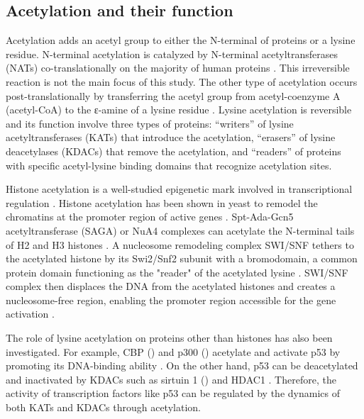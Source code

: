 \subsection{Acetylation and their function}
Acetylation adds an acetyl group to either the N-terminal of proteins or a lysine residue. N-terminal acetylation is catalyzed by N-terminal acetyltransferases (NATs) co-translationally on the majority of human proteins \cite{starheimkk_arnesent:ProteinNterminal2012}. This irreversible reaction is not the main focus of this study. The other type of acetylation occurs post-translationally by transferring the acetyl group from acetyl-coenzyme A (acetyl-CoA) to the ε-amine of a lysine residue \cite{alii_ottm:LysineAcetylation2018}. Lysine acetylation is reversible and its function involve three types of proteins: ``writers'' of lysine acetyltransferases (KATs) that introduce the acetylation, ``erasers'' of lysine deacetylases (KDACs) that remove the acetylation, and ``readers'' of proteins with specific acetyl-lysine binding domains that recognize acetylation sites.

Histone acetylation is a well-studied epigenetic mark involved in transcriptional regulation \cite{shahbazianmd_grunsteinm:FunctionsSiteSpecific2007,alii_ottm:LysineAcetylation2018}. Histone acetylation has been shown in yeast to remodel the chromatins at the promoter region of active genes \cite{suganumat_workmanjl:SignalsCombinatorial2011}. Spt-Ada-Gcn5 acetyltransferase (SAGA) or NuA4 complexes can acetylate the N-terminal tails of H2 and H3 histones \cite{hassanah_workmanjl:HistoneAcetyltransferase2001}. A nucleosome remodeling complex SWI/SNF tethers to the acetylated histone by its Swi2/Snf2 subunit with a bromodomain, a common protein domain functioning as the "reader" of the acetylated lysine \cite{awads_hassanah:Swi2Snf22008}. SWI/SNF complex then displaces the DNA from the acetylated histones and creates a nucleosome-free region, enabling the promoter region accessible for the gene activation \cite{awads_hassanah:Swi2Snf22008}.

The role of lysine acetylation on proteins other than histones has also been investigated. For example, CBP () and p300 () acetylate and activate p53 by promoting its DNA-binding ability \cite{scolnickdm_halazonetistd:CREBbindingProtein1997,brookscl_guw:ImpactAcetylation2011}. On the other hand, p53 can be deacetylated and inactivated by KDACs such as sirtuin 1 () and HDAC1 \cite{brookscl_guw:ImpactAcetylation2011,luoj_guw:DeacetylationP532000}. Therefore, the activity of transcription factors like p53 can be regulated by the dynamics of both KATs and KDACs through acetylation.



